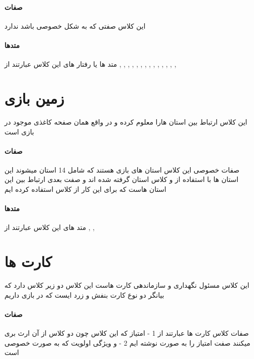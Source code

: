 \documentclass[pdf,titlepage,a4paper]{report}
\begin{document}
	\paragraph{صفات}
	این کلاس صفتی که به شکل خصوصی باشد ندارد 
	\paragraph{متدها}
	متد ها یا رفتار های این کلاس عبارتند از 
	 ,  ,  ,  ,  ,  ,  , 
	 ,  ,  ,  ,  ,  , 
	 , 
	\newpage
	\section{زمین بازی}
	این کلاس ارتباط بین استان هارا معلوم کرده و در واقع همان صفحه کاغذی موجود در بازی است

	\paragraph{صفات}
	صفات خصوصی این کلاس استان های بازی هستند که شامل 14 استان میشوند 
	این استان ها با استفاده از  و کلاس استان گرفته شده اند
	و صفت بعدی ارتباط بین این استان هاست که برای این کار از کلاس  استفاده کرده ایم
	\paragraph{متدها}
	
	متد های این کلاس عبارتند از 
	 ,  , 
	
	\newpage
	\section{کارت ها}
	این کلاس مسئول نگهداری و سازماندهی کارت هاست این کلاس دو زیر کلاس دارد که بیانگر دو نوع کارت بنفش و زرد ایست که در بازی داریم

	\paragraph{صفات}
	صفات کلاس کارت ها  عبارتند از 
	1 - امتیاز که این کلاس چون دو کلاس از آن ارث بری میکنند صفت امتیاز را به صورت   نوشته ایم
	2 - و ویژگی اولویت که به صورت خصوصی است
\end{document}
